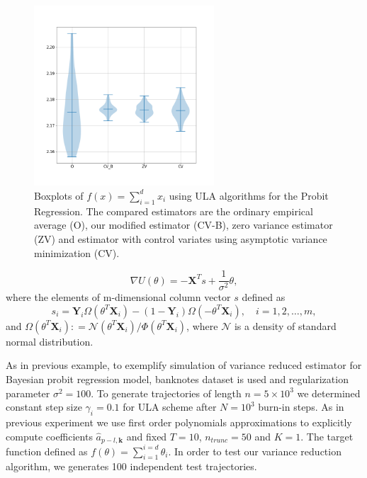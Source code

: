 \documentclass[preprint]{imsart}
\begin{document}
\begin{figure}[h]
\begin{center}
\includegraphics[width=0.6\textwidth]{pictures/Probit_banknotes_4d.png}
\caption{Boxplots of $f(x) = \sum_{i=1}^d x_i$ using ULA algorithms for the Probit Regression. The compared estimators are the ordinary empirical average  (O), our modified estimator (CV-B), zero variance estimator (ZV) and estimator with control variates using asymptotic variance minimization (CV).
 \label{fig:3}}
\end{center}
\end{figure}

\begin{equation*}
    \nabla U(\theta) = - \mathbf{X}^T s + \frac{1}{\sigma^2} \theta,
\end{equation*}
where the elements of m-dimensional column vector $s$ defined as
\begin{equation*}
    s_i = \mathbf{Y}_i \Omega (\theta^T \mathbf{X}_i) - (1 - \mathbf{Y}_i) \Omega(- \theta^T \mathbf{X}_i), \quad i = 1, 2, \dots, m,
\end{equation*}
and $\Omega(\theta^T \mathbf{X}_i) : = \mathcal{N}(\theta^T \mathbf{X}_i) / \Phi(\theta^T \mathbf{X}_i)$, where $\mathcal{N}$ is a density of standard normal distribution.  

As in previous example, to exemplify simulation of variance reduced estimator for Bayesian probit regression model, banknotes dataset is used and regularization parameter $\sigma^2=100$.
To generate trajectories of length $n = 5 \times 10^3 $ we determined constant step size $\gamma_i = 0.1$ for ULA scheme after $N = 10^3$ burn-in steps. As in previous experiment we use first order polynomials approximations to explicitly compute coefficients $\hat{a}_{p-l,\mathbf{k}}$ and fixed $T = 10$, $n_{trunc} = 50$ and $K=1$. The target function defined as $f(\theta) = \sum_{i=1}^{i=d}\theta_i$.  In order to test our variance reduction algorithm, we generates 100 independent test trajectories.
\end{document}
